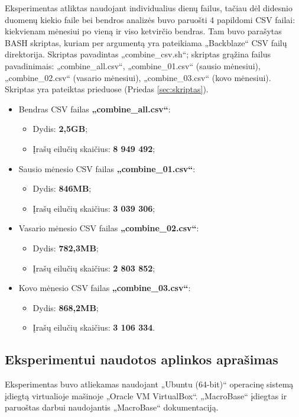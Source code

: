 \documentclass{VUMIFPSkursinis}
\begin{document}
Eksperimentas atliktas naudojant individualius dienų failus, tačiau dėl didesnio duomenų kiekio faile bei bendros analizės buvo paruošti 4 papildomi CSV failai: kiekvienam mėnesiui po vieną ir viso ketvirčio bendras. Tam buvo parašytas BASH skriptas, kuriam per argumentą yra pateikiama „Backblaze“ CSV failų direktorija. Skriptas pavadintas „combine\_csv.sh“; skriptas grąžina failus pavadinimais: „combine\_all.csv“, „combine\_01.csv“ (sausio mėnesiui), „combine\_02.csv“ (vasario mėnesiui), „combine\_03.csv“ (kovo mėnesiui). Skriptas yra pateiktas prieduose (Priedas \ref{sec:skriptas}).
\begin{itemize}
\item Bendras CSV failas \textbf{„combine\_all.csv“}:
\begin{itemize}
\item Dydis: \textbf{2,5GB};
\item Įrašų eilučių skaičius: \textbf{8 949 492};
\end{itemize}

\item Sausio mėnesio CSV failas \textbf{„combine\_01.csv“}:
\begin{itemize}
\item Dydis: \textbf{846MB};
\item Įrašų eilučių skaičius: \textbf{3 039 306};
\end{itemize}

\item Vasario mėnesio CSV failas \textbf{„combine\_02.csv“}:
\begin{itemize}
\item Dydis: \textbf{782,3MB};
\item Įrašų eilučių skaičius: \textbf{2 803 852};
\end{itemize}

\item Kovo mėnesio CSV failas \textbf{„combine\_03.csv“}:
\begin{itemize}
\item Dydis: \textbf{868,2MB};
\item Įrašų eilučių skaičius: \textbf{3 106 334}.
\end{itemize}
\end{itemize}

\subsection{Eksperimentui naudotos aplinkos aprašimas}
Eksperimentas buvo atliekamas naudojant „Ubuntu (64-bit)“ operacinę sistemą įdiegtą virtualioje mašinoje „Oracle VM VirtualBox“. „MacroBase“ įdiegtas ir paruoštas darbui naudojantis „MacroBase“ dokumentaciją.
\end{document}
